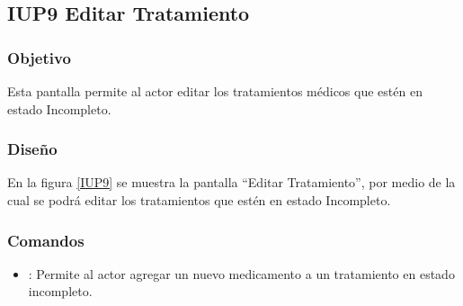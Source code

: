 \subsection{IUP9 Editar Tratamiento}
 
\subsubsection{Objetivo}

    Esta pantalla permite al actor editar los tratamientos médicos que estén en estado Incompleto.

\subsubsection{Diseño}

    En la figura \ref{IUP9} se muestra la pantalla ``Editar Tratamiento'', por medio de la cual se podrá editar los tratamientos que estén en estado Incompleto. \\


\subsubsection{Comandos}
\begin{itemize}
    \item {}: Permite al actor agregar un nuevo medicamento a un tratamiento en estado incompleto.
    
\end{itemize}

%
